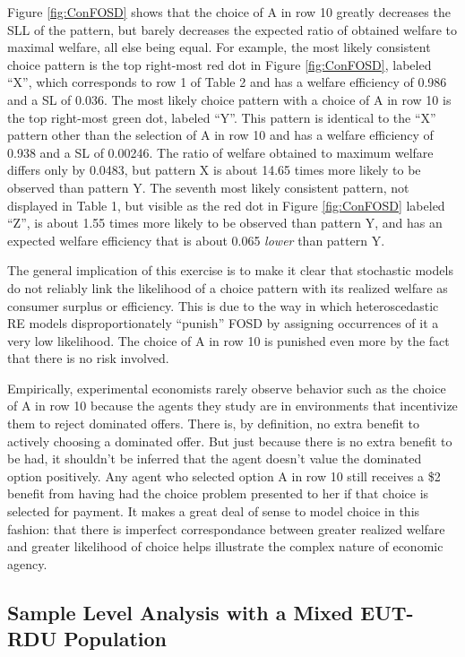 \documentclass[../main.tex]{subfiles}
\begin{document}
Figure \ref{fig:ConFOSD} shows that the choice of A in row 10 greatly decreases the SLL of the pattern, but barely decreases the expected ratio of obtained welfare to maximal welfare, all else being equal.
For example, the most likely consistent choice pattern is the top right-most red dot in Figure \ref{fig:ConFOSD}, labeled \enquote{X}, which corresponds to row 1 of Table 2 and has a welfare efficiency of 0.986 and a SL of 0.036.
The most likely choice pattern with a choice of A in row 10 is the top right-most green dot, labeled \enquote{Y}.
This pattern is identical to the \enquote{X} pattern other than the selection of A in row 10 and has a welfare efficiency of 0.938 and a SL of 0.00246.
The ratio of welfare obtained to maximum welfare differs only by 0.0483, but pattern X is about 14.65 times more likely to be observed than pattern Y.
The seventh most likely consistent pattern, not displayed in Table 1, but visible as the red dot in Figure \ref{fig:ConFOSD} labeled \enquote{Z}, is about 1.55 times more likely to be observed than pattern Y, and has an expected welfare efficiency that is about 0.065 \textit{lower} than pattern Y.

The general implication of this exercise is to make it clear that stochastic models do not reliably link the likelihood of a choice pattern with its realized welfare as consumer surplus or efficiency.
This is due to the way in which heteroscedastic RE models disproportionately \enquote{punish} FOSD by assigning occurrences of it a very low likelihood.
The choice of A in row 10 is punished even more by the fact that there is no risk involved.

Empirically, experimental economists rarely observe behavior such as the choice of A in row 10 because the agents they study are in environments that incentivize them to reject dominated offers.
There is, by definition, no extra benefit to actively choosing a dominated offer.
But just because there is no extra benefit to be had, it shouldn't be inferred that the agent doesn't value the dominated option positively.
Any agent who selected option A in row 10 still receives a \$2 benefit from having had the choice problem presented to her if that choice is selected for payment.
It makes a great deal of sense to model choice in this fashion: that there is imperfect correspondance between greater realized welfare and greater likelihood of choice helps illustrate the complex nature of economic agency.


\subsection{Sample Level Analysis with a Mixed EUT-RDU Population}
\end{document}
